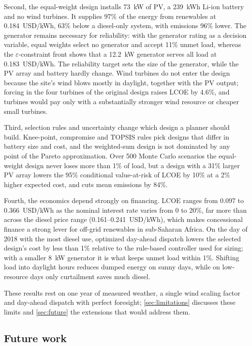\documentclass[final,3p,times]{elsarticle}
\begin{document}
Second, the equal-weight design installs 73~kW of PV, a 239~kWh Li-ion battery and no wind turbines. It supplies 97\% of the energy from renewables at 0.184~USD/kWh, 63\% below a diesel-only system, with emissions 96\% lower. The generator remains necessary for reliability: with the generator rating as a decision variable, equal weights select no generator and accept 11\% unmet load, whereas the $\varepsilon$-constraint front shows that a 12.2~kW generator serves all load at 0.183~USD/kWh. The reliability target sets the size of the generator, while the PV array and battery hardly change. Wind turbines do not enter the design because the site's wind blows mostly in daylight, together with the PV output; forcing in the four turbines of the original design raises LCOE by 4.6\%, and turbines would pay only with a substantially stronger wind resource or cheaper small turbines.

Third, selection rules and uncertainty change which design a planner should build. Knee-point, compromise and TOPSIS rules pick designs that differ in battery size and cost, and the weighted-sum design is not dominated by any point of the Pareto approximation. Over 500 Monte Carlo scenarios the equal-weight design never loses more than 1\% of load, but a design with a 31\% larger PV array lowers the 95\% conditional value-at-risk of LCOE by 10\% at a 2\% higher expected cost, and cuts mean emissions by 84\%.

Fourth, the economics depend strongly on financing. LCOE ranges from 0.097 to 0.366~USD/kWh as the nominal interest rate varies from 0 to 20\%, far more than across the diesel price range (0.161--0.241~USD/kWh), which makes concessional finance a strong lever for off-grid renewables in sub-Saharan Africa. On the day of 2018 with the most diesel use, optimized day-ahead dispatch lowers the selected design's cost by less than 1\% relative to the rule-based controller used for sizing; with a smaller 8~kW generator it is what keeps unmet load within 1\%. Shifting load into daylight hours reduces dumped energy on sunny days, while on low-resource days only curtailment saves much diesel.

These results rest on one year of measured weather, a single wind scaling factor and day-ahead dispatch with perfect foresight; \cref{sec:limitations} discusses these limits and \cref{sec:future} the extensions that would address them.

\subsection{Future work \label{sec:future}}
\end{document}
